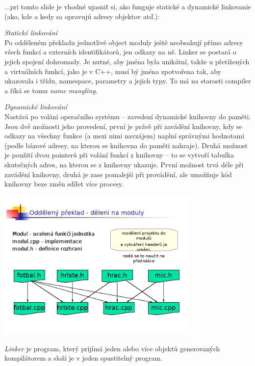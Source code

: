 ...pri tomto slide je vhodné ujasniť si, ako funguje statické a dynamické linkovanie (ako, kde a kedy sa opravujú adresy objektov atď.):
\begin{pitemize}
    \item \emph{Statické linkování} \\ Po odděleném překladu jednotlivé object moduly ještě neobsahují přímo adresy všech funkcí a externích identifikátorů, jen odkazy na ně. Linker se postará o jejich spojení dohromady. Je nutné, aby jména byla unikátní, takže u přetížených a virtuálních funkcí, jako je v C++, musí bý jména zpotvořena tak, aby ukazovala i třídu, namespace, parametry a jejich typy. To má na starosti compiler a říká se tomu \emph{name mangling}.
    \item \emph{Dynamické linkování} \\ Nastává po volání operačního systému -- zavedení dynamické knihovny do paměti. Jsou dvě možnosti jeho provedení, první je právě při zavádění knihovny, kdy se odkazy na všechny funkce (a mezi nimi navzájem) naplní správnými hodnotami (podle bázové adresy, na kterou se knihovna do paměti nahraje). Druhá možnost je použití dvou pointerů při volání funkcí z knihovny -- to se vytvoří tabulka skutečných adres, na kterou se z knihovny ukazuje. První možnost trvá déle při zavádění knihovny, druhá je zase pomalejší při provádění, ale umožňuje kód knihovny beze změn sdílet více procesy.
\end{pitemize}


\par\begin{center}\includegraphics[width=10cm]{informatika/programovanie/obrazky/oddelenypreklad03.png}\end{center}

\emph{Linker} je program, který prijímá jeden alebo více objektů generovaných kompilátorem a složí je v jeden spustitelný program.

